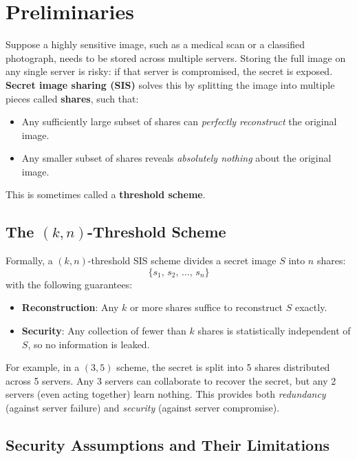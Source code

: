 \section{Preliminaries}
\label{sec:lad-prelim}


Suppose a highly sensitive image, such as a medical scan or a classified photograph, needs to be stored across multiple servers. Storing the full image on any single server is risky: if that server is compromised, the secret is exposed. \textbf{Secret image sharing (SIS)} solves this by splitting the image into multiple pieces called \textbf{shares}, such that:

\begin{itemize}
    \item Any sufficiently large subset of shares can \emph{perfectly reconstruct} the original image.
    \item Any smaller subset of shares reveals \emph{absolutely nothing} about the original image.
\end{itemize}

This is sometimes called a \textbf{threshold scheme}.

\subsection{The $(k, n)$-Threshold Scheme}

Formally, a $(k, n)$-threshold SIS scheme divides a secret image $S$ into $n$ shares:
\begin{equation}
\{s_1,\, s_2,\, \ldots,\, s_n\}
\end{equation}
with the following guarantees:

\begin{itemize}
    \item \textbf{Reconstruction}: Any $k$ or more shares suffice to reconstruct $S$ exactly.
    \item \textbf{Security}: Any collection of fewer than $k$ shares is statistically independent of $S$, so no information is leaked.
\end{itemize}

For example, in a $(3, 5)$ scheme, the secret is split into 5 shares distributed across 5 servers. Any 3 servers can collaborate to recover the secret, but any 2 servers (even acting together) learn nothing. This provides both \emph{redundancy} (against server failure) and \emph{security} (against server compromise).

\subsection{Security Assumptions and Their Limitations}

